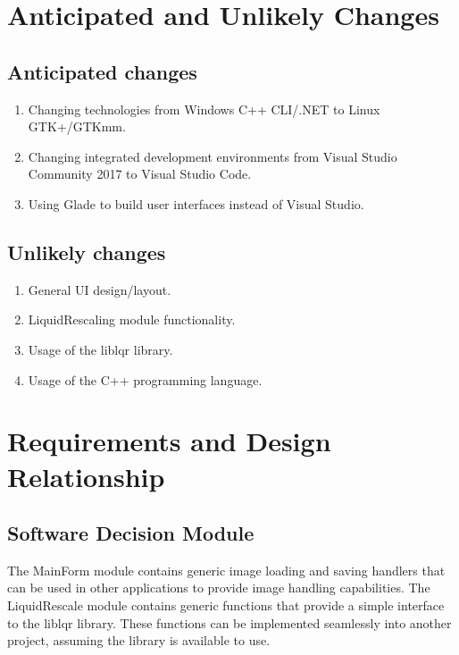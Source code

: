 \documentclass{article}
\begin{document}
\newpage

\section{Anticipated and Unlikely Changes}
\subsection{Anticipated changes}
\begin{enumerate}
    \item Changing technologies from Windows C++ CLI/.NET to Linux GTK+/GTKmm.
    \item Changing integrated development environments from Visual Studio Community 2017 to Visual Studio Code.
    \item Using Glade to build user interfaces instead of Visual Studio.
\end{enumerate}

\subsection{Unlikely changes}
\begin{enumerate}
\item General UI design/layout.
\item LiquidRescaling module functionality.
\item Usage of the liblqr library.
\item Usage of the C++ programming language.
\end{enumerate}

\newpage


\section{Requirements and Design Relationship}
\subsection{Software Decision Module}
The MainForm module contains generic image loading and saving handlers that can be used in other applications to provide image handling capabilities. The LiquidRescale module contains generic functions that provide a simple interface to the liblqr library. These functions can be implemented seamlessly into another project, assuming the library is available to use. 
\end{document}

